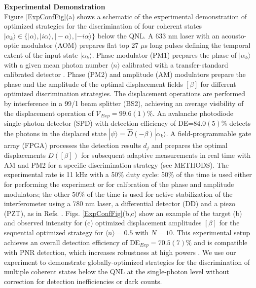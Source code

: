 \documentclass[twocolumn,pra,preprintnumbers,amsmath,amssymb,superscriptaddress,floatfix]{revtex4}%
\begin{document}
\textbf{Experimental Demonstration}\\
Figure \ref{ExpConfFig}(a) shows a schematic of the experimental
demonstration of optimized strategies for the discrimination of four
coherent states $|\alpha_{k}\rangle\in\{|\alpha\rangle,
|i\alpha\rangle,|-\alpha\rangle,|-i\alpha\rangle\}$ below the QNL. A
633 nm laser with an acousto-optic modulator (AOM) prepares flat top 27 $\mu$s
long pulses defining the temporal extent of the input state $|\alpha_{k}\rangle$.
Phase modulator (PM1) prepares the phase of $|\alpha_{k}\rangle$ with a given
mean photon number $\langle n\rangle$ calibrated with a
transfer-standard calibrated detector \cite{gentile96}. Phase
(PM2) and amplitude (AM) modulators prepare the phase and the
amplitude of the optimal displacement fields $[\beta]$ for different
optimized discrimination strategies. The displacement operations are
performed by interference in a 99/1 beam splitter (BS2), achieving
an average visibility of the displacement operation of
$\mathcal{V}_{Exp}=99.6(1)\%$. An avalanche photodiode single-photon detector
(SPD) with detection efficiency of DE=$84.0(5)\%$ detects the
photons in the displaced state
$|\psi\rangle=\hat{D}(-\beta)|\alpha_k\rangle$. A field-programmable
gate array (FPGA)  processes the detection results $d_{j}$ and
prepares the optimal displacements $\hat{D}([\beta])$ for subsequent
adaptive measurements in real time with AM and PM2 for a specific
discrimination strategy (see METHODS). The experimental rate is 11 kHz with a
50$\%$ duty cycle: 50$\%$ of the time is used either for performing
the experiment or for calibration of the phase and amplitude
modulators; the other $50\%$ of the time is used for active
stabilization of the interferometer using a 780 nm laser, a
differential detector (DD) and a piezo (PZT), as in Refs.
\cite{becerra13, becerra15}. Figs. \ref{ExpConfFig}(b,c) show an example
of the target (b) and observed intensity for (c) optimized
displacement amplitudes $[\beta]$ for the sequential optimized
strategy for $\langle n\rangle=0.5$ with $N=10$. This experimental
setup achieves an overall detection efficiency of
DE$_{Exp}=70.5(7)\%$ and is compatible with PNR detection, which
increases robustness at high powers \cite{becerra15}. We use our
experiment to demonstrate globally-optimized strategies for the
discrimination of multiple coherent states below the QNL at the
single-photon level without correction for detection inefficiencies
or dark counts.
\end{document}
